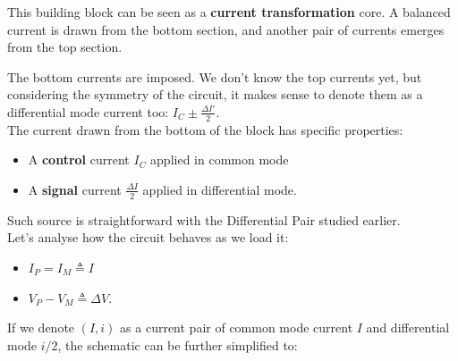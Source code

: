 \documentclass[10pt]{article}
\begin{document}
This building block can be seen as a \textbf{current transformation} core. A balanced current is drawn from the bottom section, and another pair of currents emerges from the top section. 

The bottom currents are imposed. We don't know the top currents yet, but considering the symmetry of the circuit, it makes sense to denote them as a differential mode current too: $I_C \pm \frac{\Delta I'}{2}$.\\

The current drawn from the bottom of the block has specific properties:
\begin{itemize}
	\item A \textbf{control} current $I_C$ applied in common mode
	\item A \textbf{signal} current $\frac{\Delta I}{2}$ applied in differential mode.
\end{itemize}
Such source is straightforward with the Differential Pair studied earlier.\\

Let's analyse how the circuit behaves as we load it:
\begin{itemize}
	\item $I_P = I_M \triangleq I$
	\item $V_P - V_M \triangleq \Delta V$.
\end{itemize}

If we denote $(I, i)$ as a current pair of common mode current $I$ and differential mode $i/2$, the schematic can be further simplified to:
\end{document}
